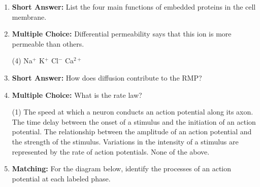 \begin{enumerate}[label=\textbf{Q2.3.\arabic*}]
      \item \textbf{Short Answer:} List the four main functions of embedded proteins in the cell membrane. \\

      \item \textbf{Multiple Choice:} Differential permeability says that this ion is more permeable than others. 
      \begin{tasks}[label=\textcolor{draculafg}{(\Alph*)}, item-format=\color{draculafg}, label-width=1.5em, item-indent=1.7em](4)
            \task Na\(^{+}\)
            \task K\(^{+}\)
            \task Cl\(^{-}\)
            \task Ca\(^{2+}\)
      \end{tasks}

      \item \textbf{Short Answer:} How does diffusion contribute to the RMP? \\

      \item \textbf{Multiple Choice:} What is the rate law? 
            \begin{tasks}[label=\textcolor{draculafg}{(\Alph*)}, item-format=\color{draculafg}, label-width=1.5em, item-indent=1.7em](1)
                  \task The speed at which a neuron conducts an action potential along its axon.
                  \task The time delay between the onset of a stimulus and the initiation of an action potential.
                  \task The relationship between the amplitude of an action potential and the strength of the stimulus.
                  \task Variations in the intensity of a stimulus are represented by the rate of action potentials.
                  \task None of the above.
            \end{tasks}


      \newpage 

      \item \textbf{Matching:} For the diagram below, identify the processes of an action potential at each labeled phase.


\end{enumerate}
